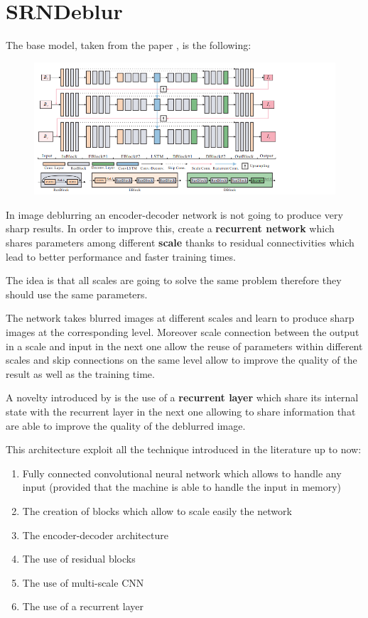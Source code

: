 \section{SRNDeblur}
The base model, taken from the paper \cite{SRN-DeblurNet},  is the following:
\begin{figure}[H]
    \centering
    \includegraphics[scale=0.5]{subsections/srndeblur/model.png}
\end{figure}

In image deblurring an encoder-decoder network is not going to produce very sharp  results. 
In order to  improve this, \cite{SRN-DeblurNet} create a \textbf{recurrent network} which shares parameters among different \textbf{scale} thanks to residual connectivities which lead to better performance and faster training times.

The idea is that all scales are going to solve the same problem therefore they should use the same parameters.

The network takes blurred images at different scales and learn to produce sharp images at the corresponding level.
Moreover scale connection between the output in a scale and input in the next one allow the reuse of parameters within different scales and skip connections on the same level allow to improve the quality of the result as well as the training time.

A novelty introduced by \cite{SRN-DeblurNet} is the use of a \textbf{recurrent layer} which share its internal state with the recurrent layer in the next one allowing to share information that are able to improve the quality of the deblurred image.

This architecture exploit all the technique introduced in the literature up to now:
\begin{enumerate}
    \item Fully connected convolutional neural network which allows to handle any input (provided that the machine is able to handle the input in memory)
    \item The creation of blocks which allow to scale easily the network
    \item The encoder-decoder architecture
    \item The use of residual blocks
    \item The use of multi-scale CNN
    \item The use of a recurrent layer
\end{enumerate}

